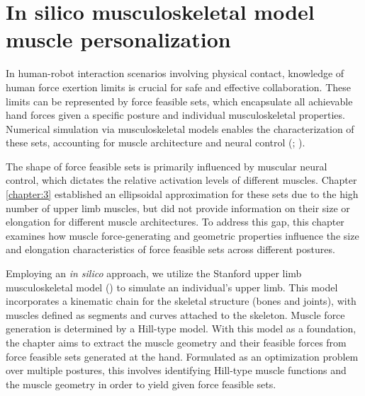 \chapter{In silico musculoskeletal model muscle personalization}
\label{chapter:4}

In human-robot interaction scenarios involving physical contact, knowledge of human force exertion limits is crucial for safe and effective collaboration. These limits can be represented by force feasible sets, which encapsulate all achievable hand forces given a specific posture and individual musculoskeletal properties.  Numerical simulation via musculoskeletal models enables the characterization of these sets, accounting for muscle architecture and neural control (\cite{skuricOnLineFeasibleWrench2022}; \cite{rezzougUpperLimbIsometricForce2021b}).

The shape of force feasible sets is primarily influenced by muscular neural control, which dictates the relative activation levels of different muscles. Chapter \ref{chapter:3} established an ellipsoidal approximation for these sets due to the high number of upper limb muscles, but did not provide information on their size or elongation for different muscle architectures. To address this gap, this chapter examines how muscle force-generating and geometric properties influence the size and elongation characteristics of force feasible sets across different postures.

Employing an \emph{in silico} approach, we utilize the Stanford upper limb musculoskeletal model (\cite{holzbaurModelUpperExtremity2005}) to simulate an individual's upper limb. This model incorporates a kinematic chain for the skeletal structure (bones and joints), with muscles defined as segments and curves attached to the skeleton. Muscle force generation is determined by a Hill-type model. With this model as a foundation, the chapter aims to extract the muscle geometry and their feasible forces from force feasible sets generated at the hand. Formulated as an optimization problem over multiple postures, this involves identifying Hill-type muscle functions and the muscle geometry in order to yield given force feasible sets.

